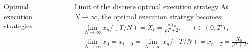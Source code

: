 \documentclass[]{beamer}
\begin{document}
\begin{frame}[t]
\begin{columns}[t]
\begin{column}{\onecolwid}
\begin{block}{Optimal execution strategies }
            
            \end{block}
    
   
    
    \end{column}
    
    
    \begin{column}{\sepwid}\end{column} %
    
    \begin{column}{\onecolwid} %
    
        
        \begin{alertblock}{Limit of the discrete optimal execution strategy}
            As $N \rightarrow \infty$, the optimal execution strategy becomes:
            \begin{align*}
                & \lim _{N \rightarrow \infty} x_n / (T/N) = \dot X _t = \frac{\rho X_0}{\rho T + 2}, \;\;\;\;\;\; t \in (0, T), \\
                & \lim _{N \rightarrow \infty} x_0 = x_{t = 0} = \lim _{N \rightarrow \infty} x_n / (T/N) = x_{t=T}=  \frac{X_0}{\rho T + 2}.  %
            \end{align*}
        \end{alertblock}


\end{column}
\end{columns}
\end{frame}
\end{document}
